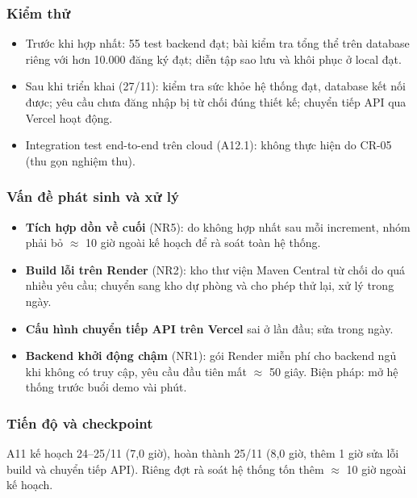 \subsubsection{Kiểm thử}

\begin{itemize}
    \item Trước khi hợp nhất: 55 test backend đạt; bài kiểm tra tổng thể trên database riêng với hơn 10.000 đăng ký đạt; diễn tập sao lưu và khôi phục ở local đạt.
    \item Sau khi triển khai (27/11): kiểm tra sức khỏe hệ thống đạt, database kết nối được; yêu cầu chưa đăng nhập bị từ chối đúng thiết kế; chuyển tiếp API qua Vercel hoạt động.
    \item Integration test end-to-end trên cloud (A12.1): không thực hiện do CR-05 (thu gọn nghiệm thu).
\end{itemize}

\subsubsection{Vấn đề phát sinh và xử lý}

\begin{itemize}
    \item \textbf{Tích hợp dồn về cuối} (NR5): do không hợp nhất sau mỗi increment, nhóm phải bỏ $\approx$ 10 giờ ngoài kế hoạch để rà soát toàn hệ thống.
    \item \textbf{Build lỗi trên Render} (NR2): kho thư viện Maven Central từ chối do quá nhiều yêu cầu; chuyển sang kho dự phòng và cho phép thử lại, xử lý trong ngày.
    \item \textbf{Cấu hình chuyển tiếp API trên Vercel} sai ở lần đầu; sửa trong ngày.
    \item \textbf{Backend khởi động chậm} (NR1): gói Render miễn phí cho backend ngủ khi không có truy cập, yêu cầu đầu tiên mất $\approx$ 50 giây. Biện pháp: mở hệ thống trước buổi demo vài phút.
\end{itemize}

\subsubsection{Tiến độ và checkpoint}

A11 kế hoạch 24--25/11 (7,0 giờ), hoàn thành 25/11 (8,0 giờ, thêm 1 giờ sửa lỗi build và chuyển tiếp API). Riêng đợt rà soát hệ thống tốn thêm $\approx$ 10 giờ ngoài kế hoạch.

